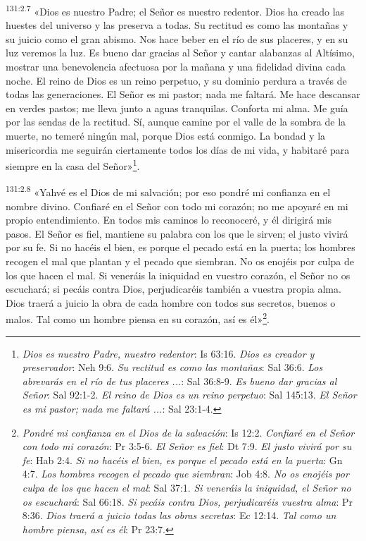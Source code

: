 \par
\textsuperscript{131:2.7} «Dios es nuestro Padre; el Señor es nuestro redentor. Dios ha creado las huestes del universo y las preserva a todas. Su rectitud es como las montañas y su juicio como el gran abismo. Nos hace beber en el río de sus placeres, y en su luz veremos la luz. Es bueno dar gracias al Señor y cantar alabanzas al Altísimo, mostrar una benevolencia afectuosa por la mañana y una fidelidad divina cada noche. El reino de Dios es un reino perpetuo, y su dominio perdura a través de todas las generaciones. El Señor es mi pastor; nada me faltará. Me hace descansar en verdes pastos; me lleva junto a aguas tranquilas. Conforta mi alma. Me guía por las sendas de la rectitud. Sí, aunque camine por el valle de la sombra de la muerte, no temeré ningún mal, porque Dios está conmigo. La bondad y la misericordia me seguirán ciertamente todos los días de mi vida, y habitaré para siempre en la casa del Señor»\footnote{\textit{Dios es nuestro Padre, nuestro redentor}: Is 63:16. \textit{Dios es creador y preservador}: Neh 9:6. \textit{Su rectitud es como las montañas}: Sal 36:6. \textit{Los abrevarás en el río de tus placeres ...}: Sal 36:8-9. \textit{Es bueno dar gracias al Señor}: Sal 92:1-2. \textit{El reino de Dios es un reino perpetuo}: Sal 145:13. \textit{El Señor es mi pastor; nada me faltará ...}: Sal 23:1-4.}.

\par
\textsuperscript{131:2.8} «Yahvé es el Dios de mi salvación; por eso pondré mi confianza en el nombre divino. Confiaré en el Señor con todo mi corazón; no me apoyaré en mi propio entendimiento. En todos mis caminos lo reconoceré, y él dirigirá mis pasos. El Señor es fiel, mantiene su palabra con los que le sirven; el justo vivirá por su fe. Si no hacéis el bien, es porque el pecado está en la puerta; los hombres recogen el mal que plantan y el pecado que siembran. No os enojéis por culpa de los que hacen el mal. Si veneráis la iniquidad en vuestro corazón, el Señor no os escuchará; si pecáis contra Dios, perjudicaréis también a vuestra propia alma. Dios traerá a juicio la obra de cada hombre con todos sus secretos, buenos o malos. Tal como un hombre piensa en su corazón, así es él»\footnote{\textit{Pondré mi confianza en el Dios de la salvación}: Is 12:2. \textit{Confiaré en el Señor con todo mi corazón}: Pr 3:5-6. \textit{El Señor es fiel}: Dt 7:9. \textit{El justo vivirá por su fe}: Hab 2:4. \textit{Si no hacéis el bien, es porque el pecado está en la puerta}: Gn 4:7. \textit{Los hombres recogen el pecado que siembran}: Job 4:8. \textit{No os enojéis por culpa de los que hacen el mal}: Sal 37:1. \textit{Si veneráis la iniquidad, el Señor no os escuchará}: Sal 66:18. \textit{Si pecáis contra Dios, perjudicaréis vuestra alma}: Pr 8:36. \textit{Dios traerá a juicio todas las obras secretas}: Ec 12:14. \textit{Tal como un hombre piensa, así es él}: Pr 23:7.}.

